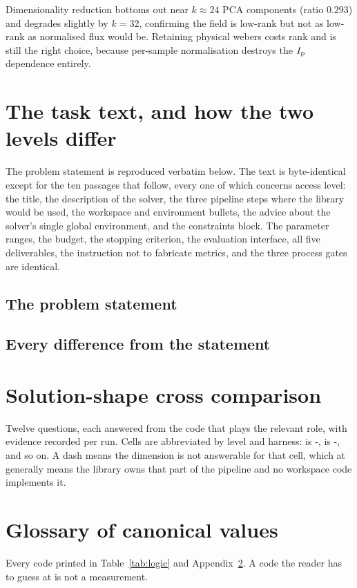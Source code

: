 Dimensionality reduction bottoms out near $k \approx 24$ PCA components (ratio
$0.293$) and degrades slightly by $k = 32$, confirming the field is low-rank but
not as low-rank as normalised flux would be. Retaining physical webers costs
rank and is still the right choice, because per-sample normalisation destroys
the $I_{\mathrm{p}}$ dependence entirely.

\section{The task text, and how the two levels differ}
\label{app:tasktext}

The \Lthree{} problem statement is reproduced verbatim below. The \Ltwo{} text
is byte-identical except for the ten passages that follow, every one of which
concerns access level: the title, the description of the solver, the three
pipeline steps where the library would be used, the workspace and environment
bullets, the advice about the solver's single global environment, and the
constraints block. The parameter ranges, the budget, the stopping criterion,
the evaluation interface, all five deliverables, the instruction not to
fabricate metrics, and the three process gates are identical.

\subsection{The \Lthree{} problem statement}


\subsection{Every difference from the \Ltwo{} statement}


\section{Solution-shape cross comparison}
\label{app:shape}

Twelve questions, each answered from the code that plays the relevant role,
with  evidence recorded per run. Cells are abbreviated by level
and harness:  is \Ltwo{}-,  is
\Lthree{}-, and so on. A dash means the dimension is not answerable
for that cell, which at \Ltwo{} generally means the library owns that part of
the pipeline and no workspace code implements it.

\begin{center}
\scriptsize

\end{center}

\section{Glossary of canonical values}
\label{app:glossary}

Every code printed in Table~\ref{tab:logic} and Appendix~\ref{app:shape}. A
code the reader has to guess at is not a measurement.


